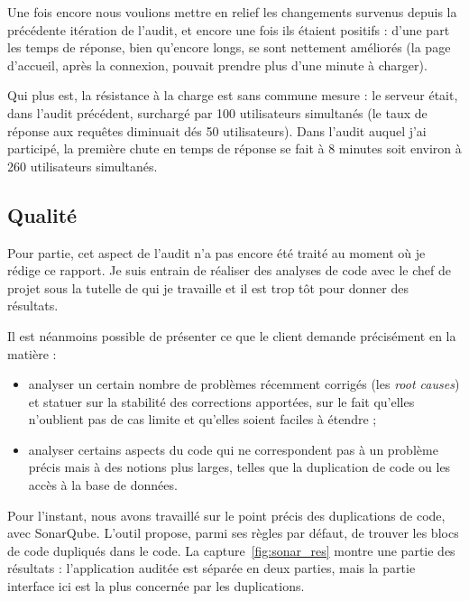 Une fois encore nous voulions mettre en relief les changements survenus depuis la précédente itération de l'audit, et encore une fois ils étaient positifs : d'une part les temps de réponse, bien qu'encore longs, se sont nettement améliorés (la page d'accueil, après la connexion, pouvait prendre plus d'une minute à charger).

Qui plus est, la résistance à la charge est sans commune mesure : le serveur était, dans l'audit précédent, surchargé par 100 utilisateurs simultanés (le taux de réponse aux requêtes diminuait dés 50 utilisateurs). Dans l'audit auquel j'ai participé, la première chute en temps de réponse se fait à 8 minutes soit environ à 260 utilisateurs simultanés. 

\subsection{Qualité}
Pour partie, cet aspect de l'audit n'a pas encore été traité au moment où je rédige ce rapport. Je suis entrain de réaliser des analyses de code avec le chef de projet sous la tutelle de qui je travaille et il est trop tôt pour donner des résultats. 

Il est néanmoins possible de présenter ce que le client demande précisément en la matière :
\begin{itemize}
  \item analyser un certain nombre de problèmes récemment corrigés (les \emph{root causes}) et statuer sur la stabilité des corrections apportées, sur le fait qu'elles n'oublient pas de cas limite et qu'elles soient faciles à étendre ;
  \item analyser certains aspects du code qui ne correspondent pas à un problème précis mais à des notions plus larges, telles que la duplication de code ou les accès à la base de données. 
\end{itemize}

Pour l'instant, nous avons travaillé sur le point précis des duplications de code, avec SonarQube. L'outil propose, parmi ses règles par défaut, de trouver les blocs de code dupliqués dans le code. La capture~\ref{fig:sonar_res} montre une partie des résultats : l'application auditée est séparée en deux parties, mais la partie \og interface \fg ici est la plus concernée par les duplications. 

